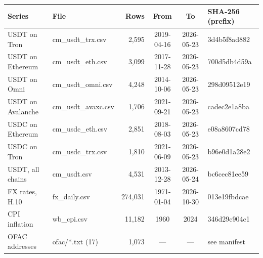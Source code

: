 \begin{tabular}{llrccl}
\toprule
Series & File & Rows & From & To & SHA-256 (prefix) \\
\midrule
USDT on Tron & cm\_usdt\_trx.csv & 2,595 & 2019-04-16 & 2026-05-23 & 3d4b5f8ad882 \\
USDT on Ethereum & cm\_usdt\_eth.csv & 3,099 & 2017-11-28 & 2026-05-23 & 700d5db4d59a \\
USDT on Omni & cm\_usdt\_omni.csv & 4,248 & 2014-10-06 & 2026-05-23 & 298d09512e19 \\
USDT on Avalanche & cm\_usdt\_avaxc.csv & 1,706 & 2021-09-21 & 2026-05-23 & cadec2e1a8ba \\
USDC on Ethereum & cm\_usdc\_eth.csv & 2,851 & 2018-08-03 & 2026-05-23 & e08a8607cd78 \\
USDC on Tron & cm\_usdc\_trx.csv & 1,810 & 2021-06-09 & 2026-05-23 & b96e0d1a28e2 \\
USDT, all chains & cm\_usdt.csv & 4,531 & 2013-12-28 & 2026-05-24 & bc6cec81ee59 \\
FX rates, H.10 & fx\_daily.csv & 274,031 & 1971-01-04 & 2026-10-30 & 013e19fbdcae \\
CPI inflation & wb\_cpi.csv & 11,182 & 1960 & 2024 & 346d29c904c1 \\
OFAC addresses & ofac/*.txt (17) & 1,073 & --- & --- & see manifest \\
\bottomrule
\end{tabular}